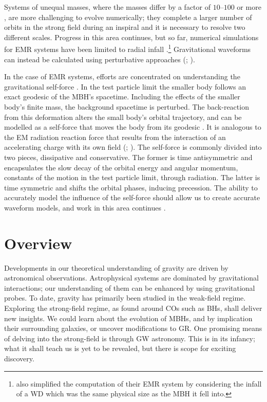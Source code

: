Systems of unequal masses, where the masses differ by a factor of $10$--$100$ or more \citep{Lousto2010,Lousto2011}, are more challenging to evolve numerically; they complete a larger number of orbits in the strong field during an inspiral and it is necessary to resolve two different scales. Progress in this area continues, but so far, numerical simulations for EMR systems have been limited to radial infall \citep{East2012}.\footnote{\citet{East2012} also simplified the computation of their EMR system by considering the infall of a WD which was the same physical size as the MBH it fell into.} Gravitational waveforms can instead be calculated using perturbative approaches (\citealt{Teukolsky1973}; \citealt[chapter 9]{Chandrasekhar1992}).

In the case of EMR systems, efforts are concentrated on understanding the gravitational self-force \citep{Barack2009,Poisson2004}. In the test particle limit the smaller body follows an exact geodesic of the MBH's spacetime. Including the effects of the smaller body's finite mass, the background spacetime is perturbed. The back-reaction from this deformation alters the small body's orbital trajectory, and can be modelled as a self-force that moves the body from its geodesic \citep{Mino1997,Quinn1997,Gralla2008}. It is analogous to the EM radiation reaction force that results from the interaction of an accelerating charge with its own field (\citealt{Dirac1938}; \citealt[sections 16.1--16.3]{Jackson1999}). The self-force is commonly divided into two pieces, dissipative and conservative. The former is time antisymmetric and encapsulates the slow decay of the orbital energy and angular momentum, constants of the motion in the test particle limit, through radiation. The latter is time symmetric and shifts the orbital phases, inducing precession. The ability to accurately model the influence of the self-force should allow us to create accurate waveform models, and work in this area continues \citep[e.g.,][]{Pound2012}.

\section{Overview}

Developments in our theoretical understanding of gravity are driven by astronomical observations. Astrophysical systems are dominated by gravitational interactions; our understanding of them can be enhanced by using gravitational probes. To date, gravity has primarily been studied in the weak-field regime. Exploring the strong-field regime, as found around COs such as BHs, shall deliver new insights. We could learn about the evolution of MBHs, and by implication their surrounding galaxies, or uncover modifications to GR. One promising means of delving into the strong-field is through GW astronomy. This is in its infancy; what it shall teach us is yet to be revealed, but there is scope for exciting discovery.

